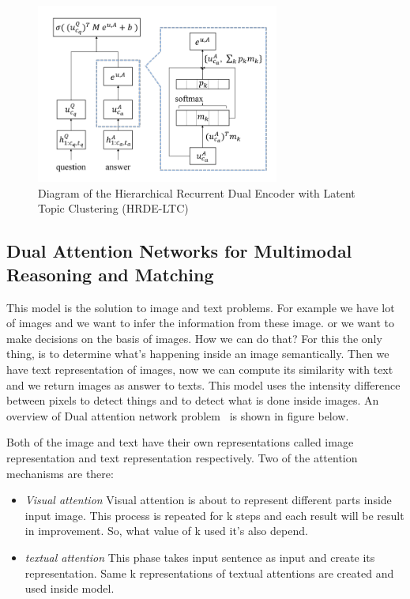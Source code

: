 \documentclass{doublecol-new}
\theoremstyle{TH}{
\newtheorem{lemma}{Lemma}
\newtheorem{theorem}[lemma]{Theorem}
\newtheorem{corrolary}[lemma]{Corrolary}
\newtheorem{conjecture}[lemma]{Conjecture}
\newtheorem{proposition}[lemma]{Proposition}
\newtheorem{claim}[lemma]{Claim}
\newtheorem{stheorem}[lemma]{Wrong Theorem}
\newtheorem{algorithm}{Algorithm}
}
\theoremstyle{THrm}{
\newtheorem{definition}{Definition}[section]
\newtheorem{question}{Question}[section]
\newtheorem{remark}{Remark}
\newtheorem{scheme}{Scheme}
}
\theoremstyle{THhit}{
\newtheorem{case}{Case}[section]
}
\begin{document}
\begin{figure}[h]
	\centerline{\includegraphics[width=8cm,keepaspectratio]{image/HRDE-LTC.PNG}}
	\caption{Diagram of the Hierarchical Recurrent Dual Encoder with Latent Topic Clustering (HRDE-LTC)}
	\label{Diagram of the HRDE-LTC}
\end{figure}

\subsection{Dual Attention Networks for Multimodal Reasoning and Matching}
This model is the solution to image and text problems. For example we have lot of images and we want to infer the information from these image. or we want to make decisions on the basis of images. How we can do that? For this the only thing, is to determine what's happening inside an image semantically. Then we have text representation of images, now we can compute its similarity with text and we return images as answer to texts. This model uses the intensity difference between pixels to detect things and to detect what is done inside images. An overview of Dual attention network problem~\cite{nam2016dual} is shown in figure below.

Both of the image and text have their own representations called image representation and text representation respectively. Two of the attention mechanisms are there:
\begin{itemize}
	\item{\em Visual attention} Visual attention is about to represent different parts inside input image. This process is repeated for k steps and each result will be result in improvement. So, what value of k used it's also depend.    
	\item{\em textual attention} This phase takes input sentence as input and create its representation. Same k representations of textual attentions are created and used inside model. 
\end{itemize}
\end{document}
